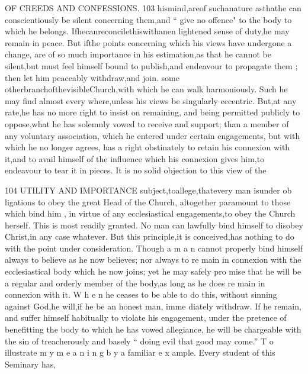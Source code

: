 \documentclass[
]{book}
\begin{document}
OF CREEDS AND CONFESSIONS. 103
hismind,areof suchanature asthathe can conscientiously be silent concerning them,and
`` give no offence" to the body to which he belongs. Ifhecanreconcilethiswithanen
lightened sense of duty,he may remain in peace. But ifthe points concerning which his views have undergone a change, are of so much importance in his estimation,as that he cannot be silent,but must feel himself bound to publish,and endeavour to propagate them ; then let him peaceably withdraw,and join. some otherbranchofthevisibleChurch,with which he can walk harmoniously. Such he may find almost every where,unless his views
be singularly eccentric. But,at any rate,he has no more right to insist on remaining, and being permitted publicly to oppose,what he has solemnly vowed to receive and support; than a member of any voluntary association, which he entered under certain engagements, but with which he no longer agrees, has a
right obstinately to retain his connexion with
it,and to avail himself of the influence which
his connexion gives him,to endeavour to tear it in pieces.
It is no solid objection to this view of the

104 UTILITY AND IMPORTANCE
subject,toallege,thatevery man isunder ob ligations to obey the great Head of the Church, altogether paramount to those which bind him , in virtue of any ecclesiastical engagements,to
obey the Church herself. This is most readily granted. No man can lawfully bind himself
to disobey Christ,in any case whatever. But
this principle,it is conceived,has nothing to do with the point under consideration. Though a m a n cannot properly bind himself always to believe as he now believes; nor always to re main in connexion with the ecclesiastical body which he now joins; yet he may safely pro mise that he will be a regular and orderly
member of the body,as long as he does re main in connexion with it. W h e n he ceases
to be able to do this, without sinning against
God,he will,if he be an honest man, imme
diately withdraw. If he remain, and suffer himself habitually to violate his engagement,
under the pretence of benefitting the body to which he has vowed allegiance, he will be chargeable with the sin of treacherously and basely `` doing evil that good may come.''
T o illustrate m y m e a n i n g b y a familiar e x ample. Every student of this Seminary has,
\end{document}
